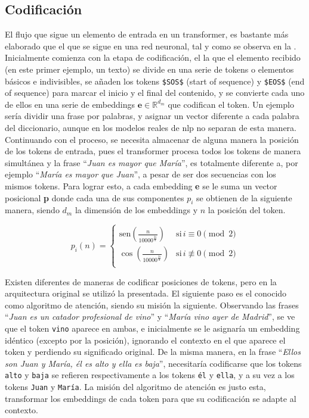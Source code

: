 			\subsection{Codificación}
			
				El flujo que sigue un elemento de entrada en un transformer, es bastante más elaborado que el que se sigue en una red neuronal, tal y como se observa en la . Inicialmente comienza con la etapa de codificación, el la que el elemento recibido (en este primer ejemplo, un texto) se divide en una serie de tokens o elementos básicos e indivisibles, se añaden los tokens \texttt{\$SOS\$} (start of sequence) y \texttt{\$EOS\$} (end of sequence) para marcar el inicio y el final del contenido, y se convierte cada uno de ellos en una serie de embeddings $\textbf{e} \in \mathbb{R}^{d_m}$ que codifican el token. Un ejemplo sería dividir una frase por palabras, y asignar un vector diferente a cada palabra del diccionario, aunque en los modelos reales de \gls{nlp} no separan de esta manera. Continuando con el proceso, se necesita almacenar de alguna manera la posición de los tokens de entrada, pues el transformer procesa todos los tokens de manera simultánea y la frase ``\textit{Juan es mayor que María}'', es totalmente diferente a, por ejemplo ``\textit{María es mayor que Juan}'', a pesar de ser dos secuencias con los mismos tokens. Para lograr esto, a cada embedding \textbf{e} se le suma un vector posicional \textbf{p} donde cada una de sus componentes $p_i$ se obtienen de la siguiente manera, siendo $d_m$ la dimensión de los embeddings y $n$ la posición del token. 
				
				$$
				p_i(n) = \begin{cases}
					\text{sen}\left(\frac{n}{10000^{\frac{2i}{d}}}\right) & \text{si}\, i \equiv 0 \pmod{2}\\
					\cos\left(\frac{n}{10000^{\frac{2i}{d}}}\right) & \text{si}\, i \not\equiv 0 \pmod{2}\\
					\end{cases}
				$$
				
				Existen diferentes de maneras de codificar posiciones de tokens, pero en la arquitectura original se utilizó la presentada. El siguiente paso es el conocido como algoritmo de atención, siendo su misión la siguiente. Observando las frases ``\textit{Juan es un catador profesional de vino}'' y ``\textit{María vino ayer de Madrid}'', se ve que el token \texttt{vino} aparece en ambas, e inicialmente se le asignaría un embedding idéntico (excepto por la posición), ignorando el contexto en el que aparece el token y perdiendo su significado original. De la misma manera, en la frase ``\textit{Ellos son Juan y María, él es alto y ella es baja}'', necesitaría codificarse que los tokens \texttt{alto} y \texttt{baja} se refieren respectivamente a los tokens \texttt{él} y \texttt{ella}, y a su vez a los tokens \texttt{Juan} y \texttt{María}. La misión del algoritmo de atención es justo esta, transformar los embeddings de cada token para que su codificación se adapte al contexto. \\
				
